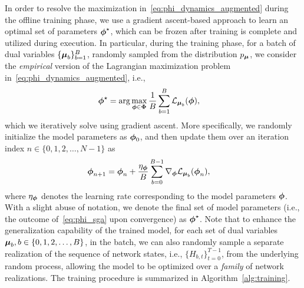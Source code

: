 \documentclass[lettersize,journal]{IEEEtran}
\newcommand{\nn}[1]{{\textcolor{red}{[\textit{Navid: #1}]}}}
\begin{document}
In order to resolve the maximization in~\eqref{eq:phi_dynamics_augmented} during the offline training phase, we use a gradient ascent-based approach to learn an optimal set of parameters $\boldsymbol{\phi}^{\star}$, which can be frozen after training is complete and utilized during execution. In particular, during the training phase, for a batch of dual variables $\{\boldsymbol{\mu}_b\}_{b=1}^B$, randomly sampled from the distribution $p_{\boldsymbol{\mu}}$, we consider the \emph{empirical} version of the Lagrangian maximization problem in~\eqref{eq:phi_dynamics_augmented}, i.e.,
\begin{align}
\boldsymbol{\phi}^{\star} &= \arg \max_{\boldsymbol{\phi} \in \boldsymbol{\Phi}} \frac{1}{B} \sum_{b=1}^B {\mathcal L}_{\boldsymbol{\mu}_b}(\boldsymbol{\phi}), \label{eq:phi_training_in_practice}
\end{align}
which we iteratively solve using gradient ascent. More specifically, we randomly initialize the model parameters as $\boldsymbol{\phi}_0$, and then update them over an iteration index $n\in\{0,1,2,\dots,N-1\}$ as
\begin{align}
\boldsymbol{\phi}_{n+1} &= \boldsymbol{\phi}_n +  \frac{\eta_{\boldsymbol{\phi}}}{B} \sum_{b=0}^{B-1} \nabla_{\boldsymbol{\phi}} {\mathcal L}_{\boldsymbol{\mu}_b}(\boldsymbol{\phi}_n),\label{eq:phi_sga}
\end{align}
where $\eta_{\boldsymbol{\phi}}$ denotes the learning rate corresponding to the model parameters $\boldsymbol{\phi}$. With a slight abuse of notation, we denote the final set of model parameters (i.e., the outcome of~\eqref{eq:phi_sga} upon convergence) as $\boldsymbol{\phi}^{\star}$. Note that to enhance the generalization capability of the trained model, for each set of dual variables $\boldsymbol{\mu}_b, b\in\{0,1,2,\dots,B\}$, in the batch, we can also randomly sample a separate realization of the sequence of network states, i.e., $\{H_{b,t}\}_{t=0}^{T-1}$, from the underlying random process, allowing the model to be optimized over a \emph{family} of network realizations. The training procedure is summarized in Algorithm~\ref{alg:training}.


\end{document}
